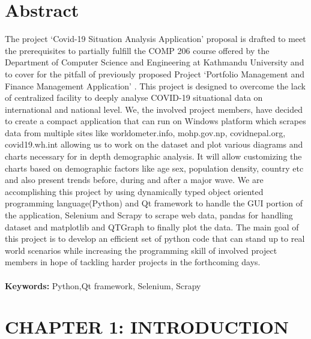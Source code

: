 \documentclass[12pt]{article}
\begin{document}
\section*{Abstract}
The project ‘Covid-19 Situation Analysis Application’ proposal is drafted to meet the prerequisites to partially fulfill the COMP 206 course offered by the 
Department of Computer Science and Engineering at Kathmandu University and to cover for the pitfall of previously proposed Project ‘Portfolio Management and 
Finance Management Application’ . This project is designed to overcome the lack of centralized facility to deeply analyse COVID-19 situational data on international 
and national level. We, the involved project members, have decided to create a compact application that can run on Windows platform which scrapes data from multiple sites 
like worldometer.info, mohp.gov.np, covidnepal.org, covid19.wh.int allowing us to work on the dataset and plot various diagrams and charts necessary for in 
depth demographic analysis. It will allow customizing the charts based on demographic factors like age sex, population density, country etc and also present trends before, 
during and after a major wave. We are accomplishing this project by using dynamically typed object oriented programming language(Python) and Qt framework to handle the GUI 
portion of the application, Selenium and Scrapy to scrape web data, pandas for handling dataset and matplotlib and QTGraph to finally plot the data. The main goal of this 
project is to develop an efficient set of python code that can stand up to real world scenarios while increasing the programming skill of involved project members in hope 
of tackling harder projects in the forthcoming days.
\\\\
\textbf{Keywords:} Python,Qt framework, Selenium, Scrapy

\clearpage
\thispagestyle{empty}
\tableofcontents

\clearpage
\thispagestyle{empty}
\listoffigures

\clearpage
{}
\section{CHAPTER 1: INTRODUCTION}
\end{document}
